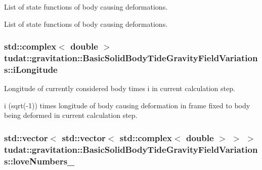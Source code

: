 List of state functions of body causing deformations. 

List of state functions of body causing deformations. 
\subsubsection[{\texorpdfstring{i\+Longitude}{iLongitude}}]{\setlength{\rightskip}{0pt plus 5cm}std\+::complex$<$ double $>$ tudat\+::gravitation\+::\+Basic\+Solid\+Body\+Tide\+Gravity\+Field\+Variations\+::i\+Longitude\hspace{0.3cm}{\ttfamily [protected]}}\hypertarget{classtudat_1_1gravitation_1_1BasicSolidBodyTideGravityFieldVariations_aaf20605f78a1e71fff58a82e047b721d}{}\label{classtudat_1_1gravitation_1_1BasicSolidBodyTideGravityFieldVariations_aaf20605f78a1e71fff58a82e047b721d}


Longitude of currently considered body times i in current calculation step. 

i (sqrt(-\/1)) times longitude of body causing deformation in frame fixed to body being deformed in current calculation step. 
\subsubsection[{\texorpdfstring{love\+Numbers\+\_\+}{loveNumbers_}}]{\setlength{\rightskip}{0pt plus 5cm}std\+::vector$<$ std\+::vector$<$ std\+::complex$<$ double $>$ $>$ $>$ tudat\+::gravitation\+::\+Basic\+Solid\+Body\+Tide\+Gravity\+Field\+Variations\+::love\+Numbers\+\_\+\hspace{0.3cm}{\ttfamily [protected]}}\hypertarget{classtudat_1_1gravitation_1_1BasicSolidBodyTideGravityFieldVariations_a87a672e14855c8795103eaa4830cf501}{}\label{classtudat_1_1gravitation_1_1BasicSolidBodyTideGravityFieldVariations_a87a672e14855c8795103eaa4830cf501}


